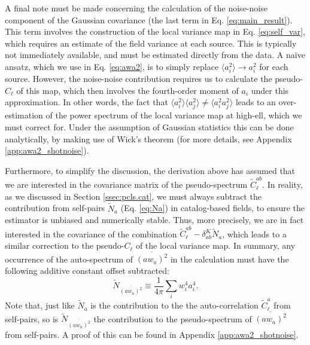 \documentclass[aps,twocolumn, superscriptaddress, english, nofootinbib, 10pt]{revtex4-2}
\begin{document}
    A final note must be made concerning the calculation of the noise-noise component of the Gaussian covariance (the last term in Eq. \ref{eq:main_result}). This term involves the construction of the local variance map in Eq. \ref{eq:self_var}, which requires an estimate of the field variance at each source. This is typically not immediately available, and must be estimated directly from the data. A na\"ive ansatz, which we use in Eq. \ref{eq:awa2}, is to simply replace $\langle a_i^2\rangle\rightarrow a_i^2$ for each source. However, the noise-noise contribution requires us to calculate the pseudo-$C_\ell$ of this map, which then involves the fourth-order moment of $a_i$ under this approximation. In other words, the fact that $\langle a_i^2\rangle\langle a_j^2\rangle\neq\langle a_i^2a_j^2\rangle$ leads to an over-estimation of the power spectrum of the local variance map at high-ell, which we must correct for. Under the assumption of Gaussian statistics this can be done analytically, by making use of Wick's theorem (for more details, see Appendix \ref{app:awa2_shotnoise}). 
    
    Furthermore, to simplify the discussion, the derivation above has assumed that we are interested in the covariance matrix of the pseudo-spectrum $\tilde{C}^{ab}_\ell$. In reality, as we discussed in Section \ref{ssec:pcls.cat}, we must always subtract the contribution from self-pairs $\tilde{N}_a$ (Eq. \ref{eq:Na}) in catalog-based fields, to ensure the estimator is unbiased and numerically stable. Thus, more precisely, we are in fact interested in the covariance of the combination $\tilde{C}^{ab}_\ell-\delta_{ab}^K\tilde{N}_a$, which leads to a similar correction to the pseudo-$C_\ell$ of the local variance map. In summary, any occurrence of the auto-spectrum of $\overline{(aw_a)^2}$ in the calculation must have the following additive constant offset subtracted:
    \begin{equation}\label{eq:4point_corr_spin0}
      \tilde{N}_{\overline{(aw_a)^2}}\equiv\frac{1}{4\pi}\sum_iw_i^4a_i^4.
    \end{equation}
    Note that, just like $\tilde{N}_a$ is the contribution to the the auto-correlation $\tilde{C}^a_\ell$ from self-pairs, so is $\tilde{N}_{\overline{(aw_a)^2}}$ the contribution to the pseudo-spectrum of $\overline{(aw_a)^2}$ from self-pairs. A proof of this can be found in Appendix \ref{app:awa2_shotnoise}.
\end{document}
